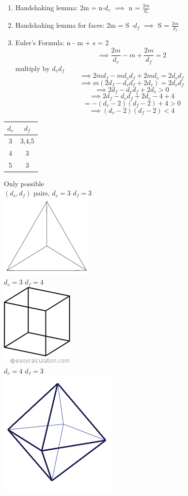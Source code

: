 \documentclass[12pt]{article}
\begin{document}
	\begin{enumerate}
		\item Handshaking lemma: 2m = n$\cdot d_v$ $\implies$ n = $\frac{2m}{d_v}$
		\item Handshaking lemma for faces: 2m = S $\cdot d_f$ $\implies$ S = $\frac{2m}{d_f}$
		\item Euler's Formula: n - m + s = 2\\
		$$\implies \frac{2m}{d_v} - m + \frac{2m}{d_f} = 2$$
		multiply by $d_vd_f$\\
		$$\implies 2md_f - md_vd_f + 2md_v = 2d_vd_f$$
		$$\implies m(2d_f - d_vd_f + 2d_v) = 2d_vd_f$$
		$$\implies 2d_f - d_vd_f + 2d_v > 0$$
		$$\implies 2d_f - d_vd_f + 2d_v - 4 + 4$$
		$$ = -(d_v - 2)(d_f - 2) + 4 > 0$$
		$$\implies (d_v - 2)(d_f - 2) < 4$$
	\end{enumerate}
	
	\begin{tabular}{c | c }
		$d_v$ & $d_f$ \\ \hline
		3 & 3,4,5 \\
		4 & 3 \\
		5 & 3 \\
	\end{tabular}
	
	Only possible \\
	$(d_v,d_f)$ pairs, $d_v = 3$ $d_f = 3$\\
	\includegraphics[scale=0.5]{tetrahedron.png}\\
	
	$d_v = 3$ $d_f = 4$\\
	\includegraphics[scale=0.5]{cube.png}\\
	
	$d_v = 4$ $d_f = 3$\\
	\includegraphics[scale=0.5]{octo.png}\\
	
\end{document}

